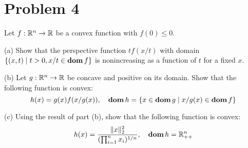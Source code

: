 \documentclass[11pt]{article}
\begin{document}
\clearpage
\section*{Problem 4}
Let $f:{{\mathbb{R}}}^n\rightarrow {{\mathbb{R}}}$ be a convex function with $f(0)\leq 0$.

(a) Show that the perspective function $tf(x/t)$ with domain $\{(x, t) \mid  t>0, x/t\in\mathop{\textbf{dom}} f\}$ is nonincreasing as a function of $t$ for a fixed $x$.

(b) Let $g:{{\mathbb{R}}}^n\rightarrow {{\mathbb{R}}}$ be concave and positive on its domain. Show that the following function is convex:
\[
h(x) = g(x)f(x/g(x)), \quad \mathop{\textbf{dom}} h=\{x\in\mathop{\textbf{dom}} g \mid  x/g(x) \in \mathop{\textbf{dom}} f\}
\]

(c) Using the result of part (b), show that the following function is convex:
\[
h(x) = \frac{\|x\|_2^2}{(\prod_{i=1}^{n}x_i)^{1/n}},\quad \mathop{\textbf{dom}} h = {{\mathbb{R}}}_{++}^n
\]
\end{document}

